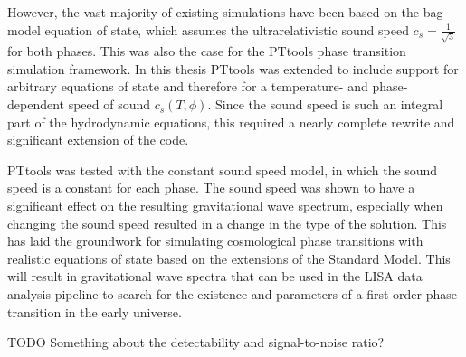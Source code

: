 However, the vast majority of existing simulations have been based on the bag model equation of state, which assumes the ultrarelativistic sound speed $c_s =\frac{1}{\sqrt{3}}$ for both phases.
This was also the case for the PTtools phase transition simulation framework.
In this thesis PTtools was extended  to include support for arbitrary equations of state and therefore for a temperature- and phase-dependent speed of sound $c_s(T,\phi)$.
Since the sound speed is such an integral part of the hydrodynamic equations,
this required a nearly complete rewrite and significant extension of the code.

PTtools was tested with the constant sound speed model, in which the sound speed is a constant for each phase.
The sound speed was shown to have a significant effect on the resulting gravitational wave spectrum,
especially when changing the sound speed resulted in a change in the type of the solution.
This has laid the groundwork for simulating cosmological phase transitions with realistic equations of state based on the extensions of the Standard Model.
This will result in gravitational wave spectra that can be used in the LISA data analysis pipeline to search for the existence and parameters of a first-order phase transition in the early universe.

TODO Something about the detectability and signal-to-noise ratio?
\fi
